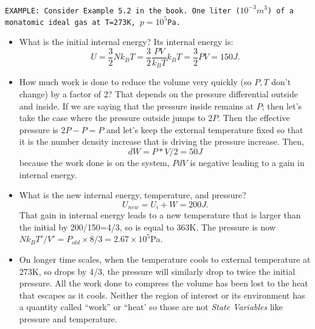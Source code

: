 \documentclass[11pt]{book}
\def\be{\begin{equation}}
\def\ee{\end{equation}}
\newcommand\example[1]{{\tt EXAMPLE: #1}}
\newcommand\bei{\begin{itemize}}
\newcommand\eei{\end{itemize}}
\begin{document}
\example{Consider Example 5.2 in the book. One liter ($10^{-3}m^3$) of a monatomic ideal gas at T=273K, $p=10^5$Pa. 
\bei
\item
What is the initial internal energy?
Its internal energy is:
\be
U=\frac32 Nk_BT = \frac32 \frac{PV}{k_BT} k_BT = \frac32 PV
=  150 J.\ee
\item How much work is done to reduce the volume very quickly (so $P,T$ don't change) by a factor of 2? That depends on the pressure differential outside and inside. If we are saying that the pressure inside remains at $P$; then let's take the case where the pressure outside jumps to $2P$. Then the effective pressure is $2P-P=P$ and let's keep the external temperature fixed so that it is the number density increase that is driving the pressure increase. Then,
\be dW = P*V/2 = 50J\ee
because the work done is on the system, $PdV$ is negative leading to a gain in internal energy.
\item What is the new internal energy, temperature, and pressure?
\be U_{new}=U_{i}+W=200J.\ee
That gain in internal energy leads to a new temperature that is larger than the initial by 200/150=4/3, so is equal to 363K.
The pressure is now $Nk_BT'/V'= P_{old} \times 8/3= 2.67\times 10^{5}$Pa.
\item On longer time scales, when the temperature cools to external temperature at 273K, so drops by 4/3, the pressure will similarly drop to twice the initial pressure. All the work done to compress the volume has been lost to the heat that escapes as it cools. Neither the region of interest or its environment has a quantity called ``work'' or ``heat' so those are not {\it State Variables} like pressure and temperature. 
\eei}
\end{document}
